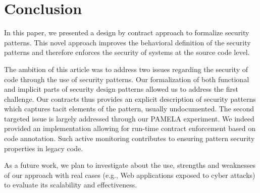 
\section{Conclusion}
In this paper, we presented a design by contract approach to formalize security patterns. This novel approach improves the behavioral definition of the security patterns and therefore enforces the security of systems at the source code level. 

The ambition of this article was to address two issues regarding the security of code through the use of security patterns. Our formalization of both functional and implicit parts of security design patterns allowed us to address the first challenge. Our contracts thus provides an explicit description of security patterns which captures tacit elements of the pattern, usually undocumented. The second targeted issue is largely addressed through our PAMELA experiment. We indeed provided an implementation allowing for run-time contract enforcement based on code annotation. Such active monitoring contributes to ensuring pattern security properties in legacy code.






As a future work, we plan to investigate about the use, strengths and weaknesses of our approach with real cases (e.g., Web applications exposed to cyber attacks) to evaluate its scalability and effectiveness.